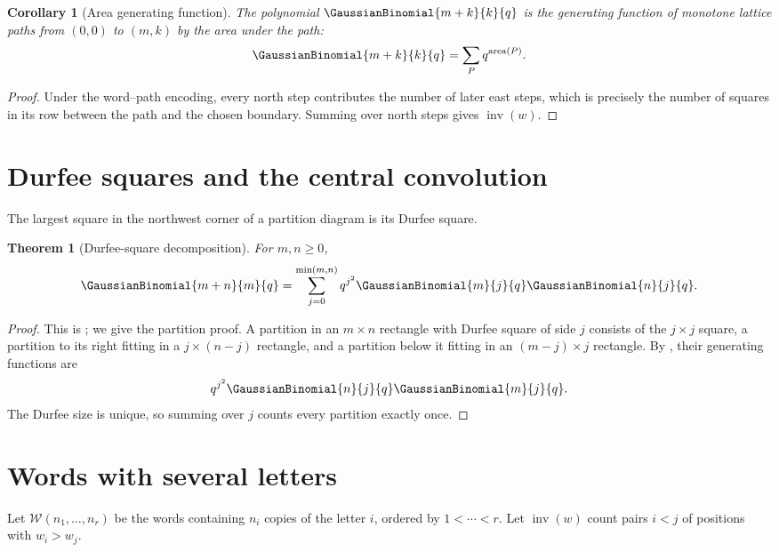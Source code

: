 \documentclass[11pt,a4paper,oneside,openany]{book}
\newtheorem{theorem}{Theorem}[chapter]
\newtheorem{corollary}[corollary]{Corollary}
\theoremstyle{definition}
\theoremstyle{remark}
\newcommand{\inv}{\operatorname{inv}}
\newcommand{\area}{\operatorname{area}}
\begin{document}
\begin{corollary}[Area generating function]\label{cor:path-area}
The polynomial $\GaussianBinomial{m+k}{k}{q}$ is the generating function of monotone lattice paths from $(0,0)$ to $(m,k)$ by the area under the path:
\[
 \GaussianBinomial{m+k}{k}{q}=\sum_P q^{\area(P)}.
\]
\end{corollary}

\begin{proof}
Under the word--path encoding, every north step contributes the number of later east steps, which is precisely the number of squares in its row between the path and the chosen boundary.  Summing over north steps gives $\inv(w)$.
\end{proof}

\section{Durfee squares and the central convolution}

The largest square in the northwest corner of a partition diagram is its Durfee square.

\begin{theorem}[Durfee-square decomposition]\label{thm:durfee-qvand}
For $m,n\ge0$,
\[
 \GaussianBinomial{m+n}{m}{q}
 =\sum_{j=0}^{\min(m,n)}q^{j^2}\GaussianBinomial{m}{j}{q}\GaussianBinomial{n}{j}{q}.
\]
\end{theorem}

\begin{proof}
This is ; we give the partition proof.  A partition in an $m\times n$ rectangle with Durfee square of side $j$ consists of the $j\times j$ square, a partition to its right fitting in a $j\times(n-j)$ rectangle, and a partition below it fitting in an $(m-j)\times j$ rectangle.  By , their generating functions are
\[
 q^{j^2}\GaussianBinomial{n}{j}{q}\GaussianBinomial{m}{j}{q}.
\]
The Durfee size is unique, so summing over $j$ counts every partition exactly once.
\end{proof}

\section{Words with several letters}

Let $\mathcal W(n_1,\dots,n_r)$ be the words containing $n_i$ copies of the letter $i$, ordered by $1<\cdots<r$.  Let $\inv(w)$ count pairs $i<j$ of positions with $w_i>w_j$.
\end{document}
